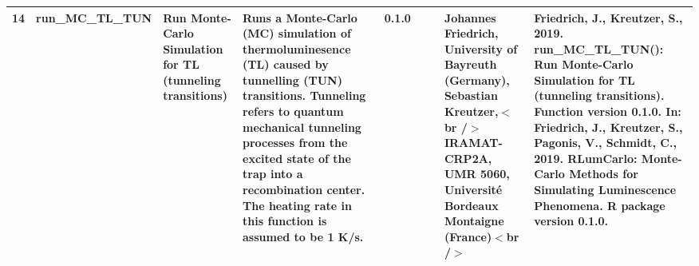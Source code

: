 \begin{table}[ht]
\begin{tabular}{rllllllll}
 \\ 
  14 & run\_MC\_TL\_TUN & Run Monte-Carlo Simulation for TL (tunneling transitions) & Runs a Monte-Carlo (MC) simulation of thermoluminesence (TL) caused by tunnelling (TUN) transitions.  Tunneling refers to quantum mechanical tunneling processes from the excited state of the trap into a recombination center. The heating rate in this function is assumed to be 1 K/s. & 0.1.0
 &  &  & Johannes Friedrich, University of Bayreuth (Germany), Sebastian Kreutzer,$<$br /$>$ IRAMAT-CRP2A, UMR 5060, Université Bordeaux Montaigne (France)$<$br /$>$ & Friedrich, J., Kreutzer, S., 2019. run\_MC\_TL\_TUN(): Run Monte-Carlo Simulation for TL (tunneling transitions). Function version 0.1.0. In: Friedrich, J., Kreutzer, S., Pagonis, V., Schmidt, C., 2019. RLumCarlo: Monte-Carlo Methods for Simulating Luminescence Phenomena. R package version 0.1.0. 
 \\ 
   \hline
\end{tabular}
\end{table}


